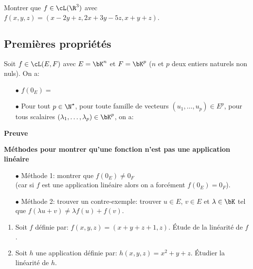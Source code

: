 \documentclass[a4paper, 11pt]{article}
\begin{document}
{\footnotesize \begin{exercice} Montrer que $f\in\cL(\R^3)$ avec $f(x,y,z)=(x-2y+z, 2x+3y-5z, x+y+z)$.\end{exercice}
}
\subsection{Premi\`{e}res propri\'et\'es}

 {\noindent  

\begin{prop} Soit $f\in\cL(E,F)$ avec $E=\bK^n$ et $F=\bK^p$ ($n$ et $p$ deux entiers naturels non nuls). On a:\vsec
\begin{itemize}
\item[$\bullet$] $f(0_E)=$\dotfill \phantom{\hspace{15cm}}\vsec
\item[$\bullet$] Pour tout $p\in\N^{\star}$, pour toute famille de vecteurs $(u_1,\dots, u_p)\in E^p$, pour tous scalaires $(\lambda_1,\dots, \lambda_p)\in\bK^p$, on a:\\
\vspace{1cm}
\end{itemize}
\end{prop}
 }
\textbf{Preuve}

\vspace{4cm}


\begin{dboxminipage}{0.7\textwidth}
\textbf{M\'ethodes pour montrer qu'une fonction n'est pas une application lin\'eaire}
\begin{itemize}
\item[$\bullet$] M\'ethode 1: montrer que $f(0_E)\not= 0_F$\\
(car si $f$ est une application lin\'eaire alors on a forc\'ement $f(0_E) = 0_F$).
\item[$\bullet$] M\'ethode 2: trouver un contre-exemple: trouver $u\in E$, $v\in E$ et $\lambda \in\bK$ tel que $f(\lambda u+v)\not= \lambda f(u)+f(v)$.
\end{itemize}
\end{dboxminipage}


 

{\footnotesize \begin{exercice} 
\begin{enumerate}
\item Soit $f$ d\'efinie par: $f(x,y,z)=(x+y+z+1, z)$. \'Etude de la lin\'earit\'e de $f$.
\item Soit $h$ une application d\'efinie par: $h(x,y,z)=x^2+y+z$. \'Etudier la lin\'earit\'e de $h$.
\end{enumerate}
\end{exercice}
}
\end{document}
